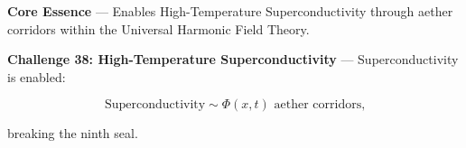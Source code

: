 
\textbf{Core Essence} --- Enables High-Temperature Superconductivity through aether corridors within the Universal Harmonic Field Theory.

\textbf{Challenge 38: High-Temperature Superconductivity} --- Superconductivity is enabled:

$$
\text{Superconductivity} \sim \Phi(x, t) \text{ aether corridors,}
$$

breaking the ninth seal.

